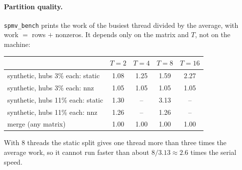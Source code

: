 \documentclass[11pt,a4paper]{article}
\begin{document}
\paragraph{Partition quality.} \texttt{spmv\_bench} prints the work of the busiest thread
divided by the average, with work $=$ rows $+$ nonzeros. It depends only on the matrix and
$T$, not on the machine:
\begin{center}
\small
\begin{tabular}{@{}lcccc@{}}
\toprule
 & $T=2$ & $T=4$ & $T=8$ & $T=16$ \\ \midrule
synthetic, hubs 3\% each: static & 1.08 & 1.25 & 1.59 & 2.27 \\
synthetic, hubs 3\% each: nnz    & 1.05 & 1.05 & 1.05 & 1.05 \\
synthetic, hubs 11\% each: static & 1.30 & -- & 3.13 & -- \\
synthetic, hubs 11\% each: nnz    & 1.26 & -- & 1.26 & -- \\
merge (any matrix)                     & 1.00 & 1.00 & 1.00 & 1.00 \\
\bottomrule
\end{tabular}
\end{center}
With 8 threads the static split gives one thread more than three times the average work, so
it cannot run faster than about $8/3.13\approx2.6$ times the serial speed.
\end{document}
